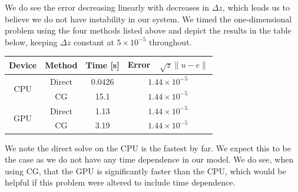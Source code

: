 \documentclass[11pt]{article}
\begin{document}
	We do see the error decreasing linearly with decreases in $ \Delta z $, which leads us to believe we do not have instability in our system.
	\newline\indent
	We timed the one-dimensional problem using the four methods listed above and depict the results in the table below, keeping $ \Delta z $ constant at $ 5\times10^{-5} $ throughout.
	\begin{center}
		\renewcommand{\arraystretch}{1.5}
		\begin{tabular}{c|c|c|c}
			\hline\hline
			\textbf{Device}&\textbf{Method}&\textbf{Time [s]}&\textbf{Error~~$\sqrt{z}\lVert u-e\rVert $}\\
			\hline
			\multirow{2}{*}{CPU}&Direct&0.0426&$1.44\times 10^{-5}$\\
			&CG&15.1&$1.44\times 10^{-5}$\\
			\hline
			\multirow{2}{*}{GPU}&Direct&1.13&$1.44\times 10^{-5}$\\
			&CG&3.19&$1.44\times 10^{-5}$\\
			\hline
		\end{tabular}
	\end{center}
	We note the direct solve on the CPU is the fastest by far. We expect this to be the case as we do not have any time dependence in our model. We do see, when using CG, that the GPU is significantly faster than the CPU, which would be helpful if this problem were altered to include time dependence.
		
		
		
\end{document}
